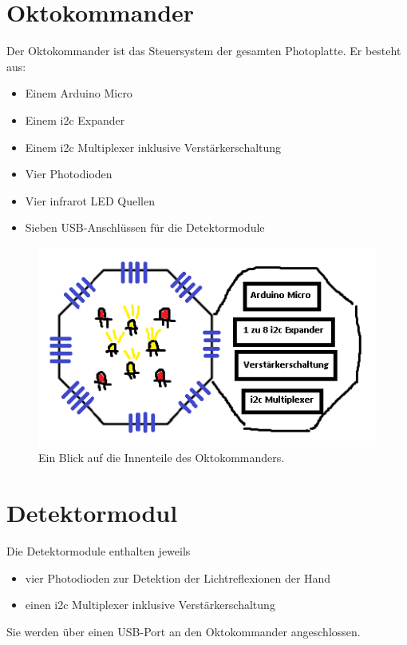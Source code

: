 \documentclass{sciposter}
\begin{document}
\begin{multicols}{3}
\section{Oktokommander}
Der Oktokommander ist das Steuersystem der gesamten Photoplatte. Er besteht aus:
\begin{itemize}
	\item Einem Arduino Micro
	\item Einem i2c Expander
	\item Einem i2c Multiplexer inklusive Verstärkerschaltung
	\item Vier Photodioden
	\item Vier infrarot LED Quellen
	\item Sieben USB-Anschlüssen für die Detektormodule
\end{itemize}

\begin{figure}[h]
	\centering
	\includegraphics[scale=1.3]{../figures/OktokommanderOffen.png}
	\caption{Ein Blick auf die Innenteile des Oktokommanders.}
	\label{fig:Oktokommander}
\end{figure}

\section{Detektormodul}
Die Detektormodule enthalten jeweils 
\begin{itemize}
	\item vier Photodioden zur Detektion der Lichtreflexionen der Hand
	\item einen i2c Multiplexer inklusive Verstärkerschaltung
\end{itemize}
Sie werden über einen USB-Port an den Oktokommander angeschlossen. 


\end{multicols}
\end{document}
